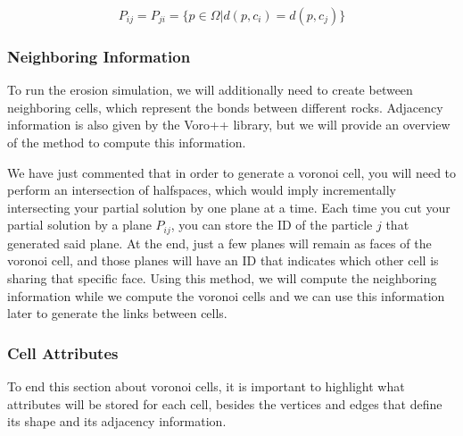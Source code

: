 \begin{equation}
    P_{ij}  = P_{ji} = \{p \in \Omega | d(p,c_i) = d(p, c_j)\}
\end{equation}

\subsubsection{Neighboring Information}
To run the erosion simulation, we will additionally need to create 
between neighboring cells, which represent the bonds between different rocks. 
Adjacency information is also given by the Voro++ \cite{osti_code-54674} library, 
but we will provide an overview of the method to compute this information.

\vspace{10pt}

We have just commented that in order to generate a voronoi cell, you will 
need to perform an intersection of halfspaces, which would imply incrementally 
intersecting your partial solution by one plane at a time. Each time you cut 
your partial solution by a plane $P_{ij}$, you can store the ID of the particle $j$
that generated said plane. At the end, just a few planes will remain as 
faces of the voronoi cell, and those planes will have an ID that indicates which 
other cell is sharing that specific face. Using this method, we will compute 
the neighboring information while we compute the voronoi cells and we can 
use this information later to generate the links between cells.
\subsubsection{Cell Attributes}

To end this section about voronoi cells, it is important to highlight 
what attributes will be stored for each cell, besides the vertices 
and edges that define its shape and its adjacency information.


